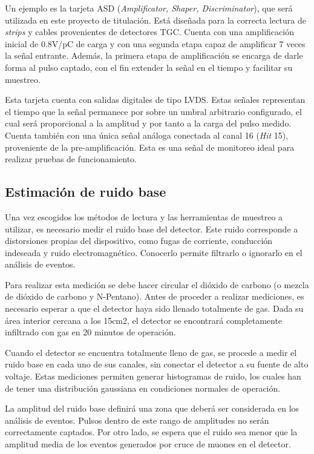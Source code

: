 		Un ejemplo es la tarjeta ASD (\textit{Amplificator, Shaper, Discriminator}), que será utilizada en este proyecto de titulación. Está diseñada para la correcta lectura de \textit{strips} y cables provenientes de detectores TGC. Cuenta con una amplificación inicial de 0.8V/pC de carga y con una segunda etapa capaz de amplificar 7 veces la señal entrante. Además, la primera etapa de amplificación se encarga de darle forma al pulso captado, con el fin extender la señal en el tiempo y facilitar su muestreo.
		
		Esta tarjeta cuenta con salidas digitales de tipo LVDS. Estas señales representan el tiempo que la señal permanece por sobre un umbral arbitrario configurado, el cual será proporcional a la amplitud y por tanto a la carga del pulso medido. Cuenta también con una única señal análoga conectada al canal 16 (\textit{Hit} 15), proveniente de la pre-amplificación. Esta es una señal de monitoreo ideal para realizar pruebas de funcionamiento.
		

	\subsection{Estimación de ruido base}
		Una vez escogidos los métodos de lectura y las herramientas de muestreo a utilizar, es necesario medir el ruido base del detector. Este ruido corresponde a distorsiones propias del dispositivo, como fugas de corriente, conducción indeseada y ruido electromagnético. Conocerlo permite filtrarlo o ignorarlo en el análisis de eventos.
		
		Para realizar esta medición se debe hacer circular el dióxido de carbono (o mezcla de dióxido de carbono y N-Pentano). Antes de proceder a realizar mediciones, es necesario esperar a que el detector haya sido llenado totalmente de gas. Dada su área interior cercana a los 15cm2, el detector se encontrará completamente infiltrado con gas en 20 minutos de operación.
		
		Cuando el detector se encuentra totalmente lleno de gas, se procede a medir el ruido base en cada uno de sus canales, sin conectar el detector a su fuente de alto voltaje. Estas mediciones permiten generar histogramas de ruido, los cuales han de tener una distribución gaussiana en condiciones normales de operación.
		
		La amplitud del ruido base definirá una zona que deberá ser considerada en los análisis de eventos. Pulsos dentro de este rango de amplitudes no serán correctamente captados. Por otro lado, se espera que el ruido sea menor que la amplitud media de los eventos generados por cruce de muones en el detector.
		
